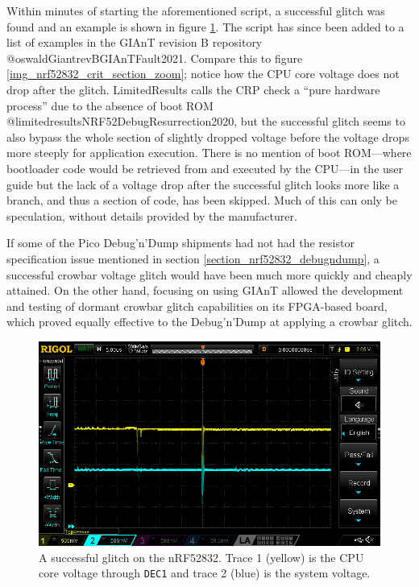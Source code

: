 Within minutes of starting the aforementioned script, a successful
glitch was found and an example is shown in figure
\ref{img_nrf52832_successful}. The script has since been added to a list
of examples in the GIAnT revision B repository
@oswaldGiantrevBGIAnTFault2021. Compare this to figure
\ref{img_nrf52832_crit_section_zoom}; notice how the CPU core voltage
does not drop after the glitch. LimitedResults calls the CRP check a
``pure hardware process'' due to the absence of boot ROM
@limitedresultsNRF52DebugResurrection2020, but the successful glitch
seems to also bypass the whole section of slightly dropped voltage
before the voltage drops more steeply for application execution. There
is no mention of boot ROM---where bootloader code would be retrieved
from and executed by the CPU---in the user guide but the lack of a
voltage drop after the successful glitch looks more like a branch, and
thus a section of code, has been skipped. Much of this can only be
speculation, without details provided by the manufacturer.

If some of the Pico Debug'n'Dump shipments had not had the resistor
specification issue mentioned in section
\ref{section_nrf52832_debugndump}, a successful crowbar voltage glitch
would have been much more quickly and cheaply attained. On the other
hand, focusing on using GIAnT allowed the development and testing of
dormant crowbar glitch capabilities on its FPGA-based board, which
proved equally effective to the Debug'n'Dump at applying a crowbar
glitch.

\begin{figure}
\centering
\includegraphics[width=5.72917in,height=\textheight]{res/nrf52832_successful.png}
\caption{A successful glitch on the nRF52832. Trace 1 (yellow) is the
CPU core voltage through \texttt{DEC1} and trace 2 (blue) is the system
voltage. \label{img_nrf52832_successful}}
\end{figure}

